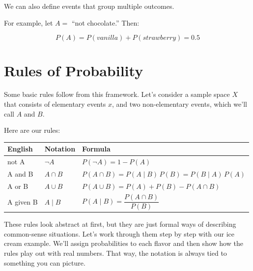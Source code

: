 \documentclass[
  letterpaper,
  DIV=11,
  numbers=noendperiod]{scrreprt}
\begin{document}
We can also define events that group multiple outcomes.

For example, let \(A=\) ``not chocolate.'' Then:

\[P(A) = P(vanilla) + P(strawberry)  = 0.5\]

\section{Rules of Probability}\label{rules-of-probability}

Some basic rules follow from this framework. Let's consider a sample
space \(X\) that consists of elementary events \(x\), and two
non-elementary events, which we'll call \(A\) and \(B\).

Here are our rules:

\begin{longtable}[]{@{}
  >{\raggedright\arraybackslash}p{}
  >{\raggedright\arraybackslash}p{}
  >{\raggedright\arraybackslash}p{}@{}}
\toprule\noalign{}
\begin{minipage}[b]{\linewidth}\raggedright
English
\end{minipage} & \begin{minipage}[b]{\linewidth}\raggedright
Notation
\end{minipage} & \begin{minipage}[b]{\linewidth}\raggedright
Formula
\end{minipage} \\
\midrule\noalign{}
\endhead
\bottomrule\noalign{}
\endlastfoot
not A & \(\neg A\) & \(P(\neg A) = 1 - P(A)\) \\
A and B & \(A \cap B\) &
\(P(A \cap B) = P(A\mid B)\,P(B) = P(B\mid A)\,P(A)\) \\
A or B & \(A \cup B\) & \(P(A \cup B) = P(A) + P(B) - P(A \cap B)\) \\
A given B & \(A \mid B\) &
\(P(A \mid B) = \dfrac{P(A \cap B)}{P(B)}\) \\
\end{longtable}

These rules look abstract at first, but they are just formal ways of
describing common-sense situations. Let's work through them step by step
with our ice cream example. We'll assign probabilities to each flavor
and then show how the rules play out with real numbers. That way, the
notation is always tied to something you can picture.
\end{document}
